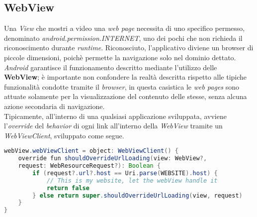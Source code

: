 \documentclass{article}
\begin{document}
\subsection*{WebView}
Una \textit{View} che mostri a video una \textit{web page} necessita di uno specifico permesso, denominato \textit{android.permission.INTERNET}, uno dei pochi che non richieda il riconoscimento durante \textit{runtime}. Riconosciuto, l'applicativo diviene un browser di piccole dimensioni, poichè permette la navigazione solo nel dominio dettato.\vspace*{7pt}\\
\textit{Android} garantisce il funzionamento descritto mediante l'utilizzo delle \textbf{WebView}; è importante non confondere la realtà descritta rispetto alle tipiche funzionalità condotte tramite il \textit{browser}, in questa casistica le \textit{web pages} sono attuate solamente per la visualizzazione del contenuto delle stesse, senza alcuna azione secondaria di navigazione.\vspace*{7pt}\\
Tipicamente, all'interno di una qualsiasi applicazione sviluppata, avviene l'\textit{override} del \textit{behavior} di ogni link all'interno della \textit{WebView} tramite un \textit{WebViewClient}, sviluppato come segue.
\begin{lstlisting}[language=JAVA]
webView.webViewClient = object: WebViewClient() {
    override fun shouldOverrideUrlLoading(view: WebView?, 
    request: WebResourceRequest?): Boolean {
        if (request?.url?.host == Uri.parse(WEBSITE).host) {
            // This is my website, let the webView handle it
            return false
        } else return super.shouldOverrideUrlLoading(view, request)
    }
}
\end{lstlisting}
\end{document}

